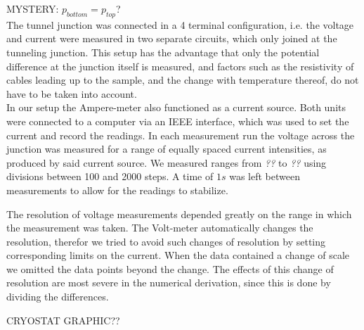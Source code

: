 MYSTERY: $p_{bottom} = p_{top}$?\\

The tunnel junction was connected in a 4 terminal configuration, i.e. the voltage and current were measured in two separate circuits, which only joined at the tunneling junction. This setup has the advantage that only the potential difference at the junction itself is measured, and factors such as the resistivity of cables leading up to the sample, and the change with temperature thereof, do not have to be taken into account. \\

In our setup the Ampere-meter also functioned as a current source. Both units were connected to a computer via an IEEE interface, which was used to set the current and record the readings. In each measurement run the voltage across the junction was measured for a range of equally spaced current intensities, as produced by said current source.  We measured ranges from \emph{??} to  \emph{??} using divisions between 100 and 2000 steps. A time of $1s$ was left between measurements to allow for the readings to stabilize.

The resolution of voltage measurements depended greatly on the range in which the measurement was taken. The Volt-meter automatically changes the resolution, therefor we tried to avoid such changes of resolution by setting corresponding limits on the current. When the data contained a change of scale we omitted the data points beyond the change. The effects of this change of resolution are most severe in the numerical derivation, since this is done by dividing the differences.

CRYOSTAT GRAPHIC??\\






